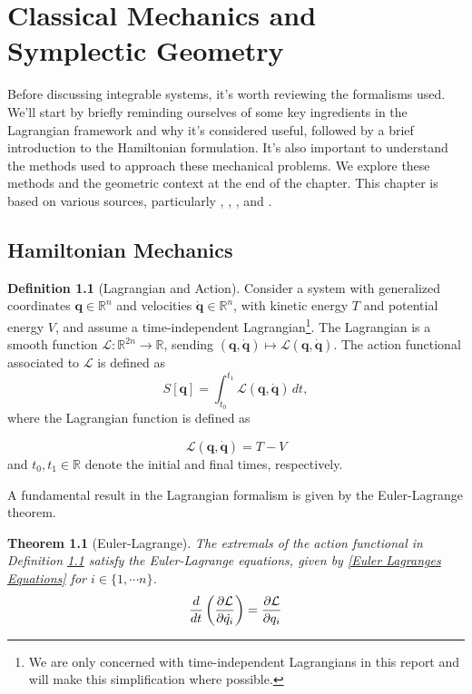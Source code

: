 \documentclass[12pt,oneside]{report}
\newtheorem{theorem}{Theorem}[section]  %
\theoremstyle{definition}
\newtheorem{definition}{Definition}
\begin{document}
 




\chapter{Classical Mechanics and Symplectic Geometry}
Before discussing integrable systems, it's worth reviewing the formalisms used. We'll start by briefly reminding ourselves of some key ingredients in the Lagrangian framework and why it's considered useful, followed by a brief introduction to the Hamiltonian formulation. It's also important to understand the methods used to approach these mechanical problems. We explore these methods and the geometric context at the end of the chapter. This chapter is based on various sources, particularly \cite{arnol2013mathematical}, \cite{goldstein2002classical}, \cite{TMPB23/24}, and \cite{DavidTong}.



\section{Hamiltonian Mechanics}


\begin{definition}[Lagrangian and Action]\label{Definition 1}
Consider a system with generalized coordinates $\mathbf{q} \in \mathbb{R}^{n}$ and velocities $\dot{\mathbf{q}} \in \mathbb{R}^{n}$, with kinetic energy $T$ and potential energy $V$, and assume a time-independent Lagrangian\footnote{We are only concerned with time-independent Lagrangians in this report and will make this simplification where possible.}. The Lagrangian is a smooth function $
\mathcal{L} : \mathbb{R}^{2n} \to \mathbb{R}$, sending $ (\mathbf{q},\dot{\mathbf{q}}) \mapsto \mathcal{L}(\mathbf{q},\dot{\mathbf{q}}) 
$. The action functional associated to $\mathcal{L}$ is defined as
\[
S[\mathbf{q}] = \int_{t_0}^{t_1} \mathcal{L}(\mathbf{q},\dot{\mathbf{q}})\,dt,
\]
where the Lagrangian function is defined as

\begin{equation}\mathcal{L}(\mathbf{q},\dot{\mathbf{q}}) = T-V\end{equation}
and $t_0, t_1 \in \mathbb{R}$ denote the initial and final times, respectively.
\end{definition}

\noindent A fundamental result in the Lagrangian formalism is given by the Euler-Lagrange theorem.
\begin{theorem}[Euler-Lagrange]\label{Theorem Euler-Lagrange}
    The extremals of the action functional in Definition \ref{Definition 1} satisfy the Euler-Lagrange equations, given by \autoref{Euler Lagranges Equations} for $i \in \{1,\cdots n\}$.
    \begin{equation} \label{Euler Lagranges Equations}
        \displaystyle\frac{d }{d t} \left( \displaystyle\frac{\partial \mathcal{L}}{\partial \dot{q_{i}}} \right) = \displaystyle\frac{\partial \mathcal{L}}{\partial q_{i}} 
    \end{equation}
\end{theorem}
\end{document}
